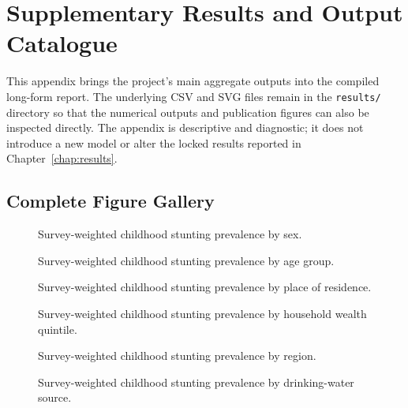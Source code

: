\chapter{Supplementary Results and Output Catalogue}
\label{app:supplementary_results}

This appendix brings the project's main aggregate outputs into the compiled long-form report. The underlying CSV and SVG files remain in the \texttt{results/} directory so that the numerical outputs and publication figures can also be inspected directly. The appendix is descriptive and diagnostic; it does not introduce a new model or alter the locked results reported in Chapter~\ref{chap:results}.

\section{Complete Figure Gallery}

\begin{figure}[H]
\centering

\caption{Survey-weighted childhood stunting prevalence by sex.}
\end{figure}

\begin{figure}[H]
\centering

\caption{Survey-weighted childhood stunting prevalence by age group.}
\end{figure}

\begin{figure}[H]
\centering

\caption{Survey-weighted childhood stunting prevalence by place of residence.}
\end{figure}

\begin{figure}[H]
\centering

\caption{Survey-weighted childhood stunting prevalence by household wealth quintile.}
\end{figure}

\begin{figure}[H]
\centering

\caption{Survey-weighted childhood stunting prevalence by region.}
\end{figure}

\begin{figure}[H]
\centering

\caption{Survey-weighted childhood stunting prevalence by drinking-water source.}
\end{figure}

